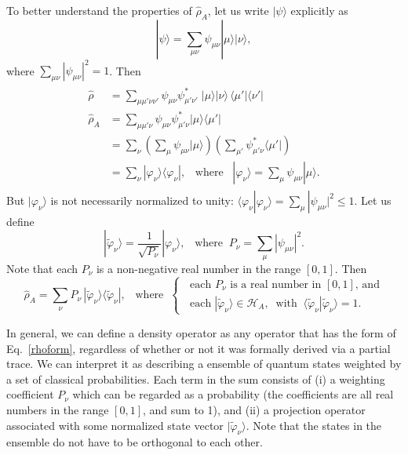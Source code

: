 \documentclass[pra,12pt]{revtex4-2}
\begin{document}
To better understand the properties of $\hat{\rho}_A$, let us write
$|\psi\rangle$ explicitly as
\begin{equation}
  |\psi\rangle = \sum_{\mu\nu} \psi_{\mu\nu} |\mu\rangle |\nu\rangle,
\end{equation}
where $\sum_{\mu\nu} |\psi_{\mu\nu}|^2 = 1$.  Then
\begin{align}
  \begin{aligned}
    \hat{\rho} &= \sum_{\mu\mu'\nu\nu'} \psi_{\mu\nu}
    \psi_{\mu'\nu'}^* \; |\mu\rangle |\nu\rangle \,
    \langle\mu'|\langle \nu'| \\
    \hat{\rho}_A &= \sum_{\mu\mu'\nu} \psi_{\mu\nu}\psi_{\mu'\nu}^* |\mu\rangle
    \langle\mu'| \\
    &= \sum_\nu \left(\sum_\mu \psi_{\mu\nu} |\mu\rangle\right)
    \left(\sum_{\mu'} \psi_{\mu'\nu}^*\langle\mu'|\right) \\
    &= \sum_\nu |\varphi_\nu\rangle \langle \varphi_\nu|,
    \;\;\;\mathrm{where}\;\;\;
    |\varphi_\nu\rangle = \sum_\mu \psi_{\mu\nu} |\mu\rangle.
  \end{aligned}
\end{align}
But $|\varphi_\nu\rangle$ is not necessarily normalized to unity:
$\langle \varphi_\nu | \varphi_\nu\rangle =
\sum_{\mu}|\psi_{\mu\nu}|^2 \le 1$.  Let us define
\begin{equation}
  |\tilde{\varphi}_\nu\rangle = \frac{1}{\sqrt{P_\nu}} |\varphi_\nu\rangle,
  \;\;\;\mathrm{where} \;\; P_\nu = \sum_{\mu}|\psi_{\mu\nu}|^2.
\end{equation}
Note that each $P_\nu$ is a non-negative real number in the range
$[0,1]$.  Then
\begin{equation}
  \hat{\rho}_A = \sum_\nu P_\nu\, |\tilde{\varphi}_\nu\rangle
  \langle \tilde{\varphi}_\nu|,
  \;\;\;\mathrm{where}\;\;
  \begin{cases}
    \;\;\textrm{each $P_\nu$ is a real number in $[0,1]$, and} \\
    \;\;\textrm{each}\; |\tilde{\varphi}_\nu\rangle \in \mathscr{H}_A,
    \;\;\mathrm{with}
    \;\;\langle\tilde{\varphi}_\nu|\tilde{\varphi}_\nu\rangle = 1.
  \end{cases}
  \label{rhoform}
\end{equation}

In general, we can define a density operator as any operator that has
the form of Eq.~\eqref{rhoform}, regardless of whether or not it was
formally derived via a partial trace.  We can interpret it as
describing a ensemble of quantum states weighted by a set of classical
probabilities.  Each term in the sum consists of (i) a weighting
coefficient $P_\nu$ which can be regarded as a probability (the
coefficients are all real numbers in the range $[0,1]$, and sum to 1),
and (ii) a projection operator associated with some normalized state
vector $|\tilde{\varphi}_\nu\rangle$.  Note that the states in the
ensemble do not have to be orthogonal to each other.
\end{document}
